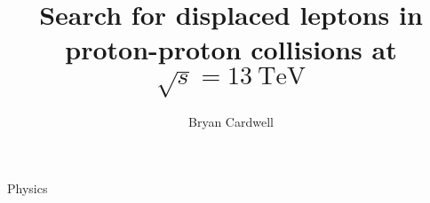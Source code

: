 \documentclass{osudissert96}
\begin{document}
\author{Bryan Cardwell}
\title{Search for displaced leptons in proton-proton collisions at $\sqrt{s}=\SI{13}{\TeV}$}
\unit{Physics}
\maketitle

\disscopyright

\begin{abstract}
  
\end{abstract}

\dedication{For Cristiana and Montague.}



\tableofcontents
\listoftables
\listoffigures

\linenumbers







\appendix






\end{document}
